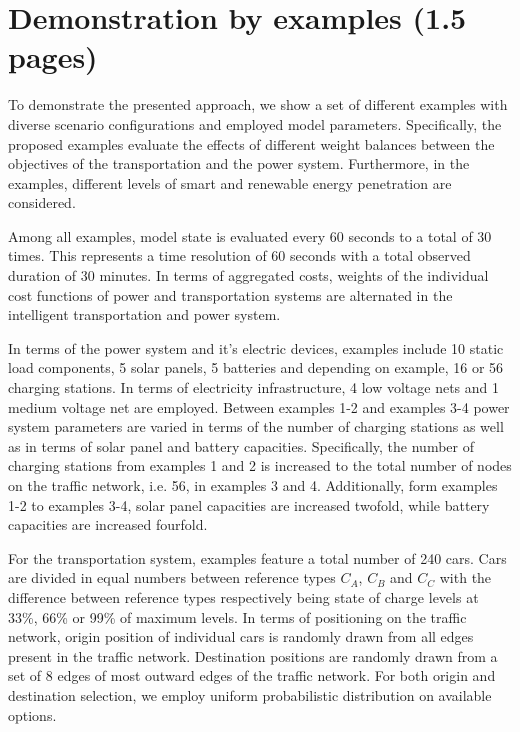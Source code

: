 \section{Demonstration by examples (1.5 pages)}
\label{section:evaluation}

To demonstrate the presented approach, we show a set of different examples with diverse scenario configurations and employed model parameters. Specifically, the proposed examples evaluate the effects of different weight balances between the objectives of the transportation and the power system. 
Furthermore, in the examples, different levels of smart and renewable energy penetration are considered. 


Among all examples, model state is evaluated every 60 seconds to a total of 30 times. This represents a time resolution of 60 seconds with a total observed duration of 30 minutes. 
In terms of aggregated costs, weights of the individual cost functions of power and transportation systems are alternated in the intelligent transportation and power system.

In terms of the power system and it's electric devices, examples include 10 static load components, 5 solar panels, 5 batteries and depending on example, 16 or 56 charging stations. In terms of electricity infrastructure, 4 low voltage nets and 1 medium voltage net are employed. Between examples 1-2 and examples 3-4 power system parameters are varied in terms of the number of charging stations as well as in terms of solar panel and battery capacities. Specifically, the number of charging stations from examples 1 and 2 is increased to the total number of nodes on the traffic network, i.e. 56, in examples 3 and 4. Additionally, form examples 1-2 to examples 3-4, solar panel capacities are increased twofold, while battery capacities are increased fourfold. 

For the transportation system, examples feature a total number of 240 cars. Cars are divided in equal numbers between reference types $C_{A}$, $C_{B}$ and $C_{C}$ with the difference between reference types respectively being state of charge levels at 33\%, 66\% or 99\% of maximum levels. In terms of positioning on the traffic network, origin position of individual cars is randomly drawn from all edges present in the traffic network. Destination positions are randomly drawn from a set of 8 edges of most outward edges of the traffic network. For both origin and destination selection, we employ uniform probabilistic distribution on available options. 

